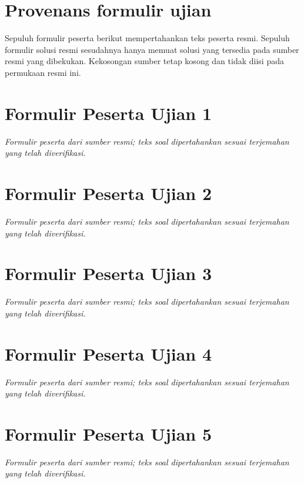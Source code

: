 \documentclass[11pt,a4paper,oneside]{book}
\begin{document}
\chapter*{Provenans formulir ujian}
Sepuluh formulir peserta berikut mempertahankan teks peserta resmi. Sepuluh formulir solusi resmi sesudahnya hanya memuat solusi yang tersedia pada sumber resmi yang dibekukan. Kekosongan sumber tetap kosong dan tidak diisi pada permukaan resmi ini.

\providecommand{\theHfakt}{}

\chapter{Formulir Peserta Ujian 1}
\noindent\textit{Formulir peserta dari sumber resmi; teks soal dipertahankan sesuai terjemahan yang telah diverifikasi.}
\begingroup
\renewcommand{\theHfakt}{o011.exam.learner.01.\arabic{fakt}}

\endgroup

\chapter{Formulir Peserta Ujian 2}
\noindent\textit{Formulir peserta dari sumber resmi; teks soal dipertahankan sesuai terjemahan yang telah diverifikasi.}
\begingroup
\renewcommand{\theHfakt}{o011.exam.learner.02.\arabic{fakt}}

\endgroup

\chapter{Formulir Peserta Ujian 3}
\noindent\textit{Formulir peserta dari sumber resmi; teks soal dipertahankan sesuai terjemahan yang telah diverifikasi.}
\begingroup
\renewcommand{\theHfakt}{o011.exam.learner.03.\arabic{fakt}}

\endgroup

\chapter{Formulir Peserta Ujian 4}
\noindent\textit{Formulir peserta dari sumber resmi; teks soal dipertahankan sesuai terjemahan yang telah diverifikasi.}
\begingroup
\renewcommand{\theHfakt}{o011.exam.learner.04.\arabic{fakt}}

\endgroup

\chapter{Formulir Peserta Ujian 5}
\noindent\textit{Formulir peserta dari sumber resmi; teks soal dipertahankan sesuai terjemahan yang telah diverifikasi.}
\begingroup
\renewcommand{\theHfakt}{o011.exam.learner.05.\arabic{fakt}}

\endgroup
\end{document}
